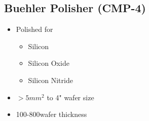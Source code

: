 \subsection{Buehler Polisher (CMP-4)}\label{cmp_machine_semi_clean}
\WaferSemiClean

\begin{minipage}[H]{\MachinePictureMiniPageWidth}
\end{minipage}\begin{minipage}[H]{\MachineTextMiniPageWidth}
\begin{itemize}
	\item Polished for
	\begin{itemize}
		\item Silicon
		\item Silicon Oxide 
		\item Silicon Nitride
	\end{itemize}
	\item $>5mm^2$ to 4" wafer size
	\item 100-800\um wafer thickness
\end{itemize}
\end{minipage}

